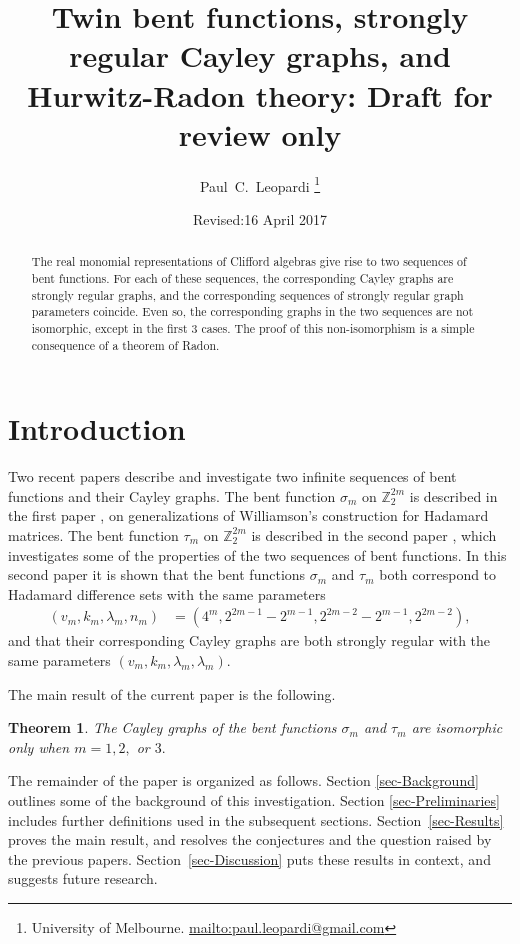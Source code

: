 \documentclass[12pt,a4paper]{article}
\title{Twin bent functions, strongly regular Cayley graphs, and Hurwitz-Radon theory:
Draft for review only}
\author{
Paul~C.~Leopardi
\thanks{University of Melbourne.
\protect\url{mailto:paul.leopardi@gmail.com}}
}
\date{Revised:16 April 2017}
\newcommand{\mb}[1]{\mathbb{#1}}
\newcommand{\Z}{\mb{Z}}
\newtheorem{Theorem}{Theorem}
\begin{document}
\maketitle

\begin{abstract}
%
The real monomial representations of Clifford algebras
give rise to two sequences of bent functions.
For each of these sequences, the corresponding Cayley graphs are
strongly regular graphs, and the corresponding sequences of strongly regular graph parameters coincide.
Even so, the corresponding graphs in the two sequences are not isomorphic, except in the first 3 cases.
The proof of this non-isomorphism is a simple consequence of a theorem of Radon.
%
\end{abstract}

\section{Introduction}
\label{sec-Introduction}
Two recent papers \cite{Leo14Constructions,Leo15Twin} describe and investigate two infinite sequences of bent functions and their Cayley graphs.
The bent function $\sigma_m$ on $\Z_2^{2 m}$ is described in the first paper \cite{Leo14Constructions}, on
generalizations of Williamson's construction for Hada\-mard matrices.
The bent function $\tau_m$ on $\Z_2^{2 m}$ is described in the second paper \cite{Leo15Twin},
which investigates some of the properties of the two sequences of bent functions.
In this second paper it is shown that the bent functions $\sigma_m$ and $\tau_m$ both correspond to Hada\-mard difference sets with the same parameters
\begin{align*}
(v_m,k_m,\lambda_m,n_m) &= (4^m, 2^{2 m - 1} - 2^{m-1}, 2^{2 m - 2} - 2^{m-1}, 2^{2 m - 2}),
\end{align*}
and that their corresponding Cayley graphs are both strongly regular with the same parameters $(v_m,k_m,\lambda_m,\lambda_m)$.

The main result of the current paper is the following.
\begin{Theorem}\label{HR-non-imomorphic-theorem}
The Cayley graphs of the bent functions $\sigma_m$ and $\tau_m$ are isomorphic only when $m=1, 2,$ or $3.$
\end{Theorem}

The remainder of the paper is organized as follows.
Section \ref{sec-Background} outlines some of the background of this investigation.
Section \ref{sec-Preliminaries} includes further definitions used in the subsequent sections.
Section~\ref{sec-Results} proves the main result, and resolves the conjectures and the question raised by the previous papers.
Section~\ref{sec-Discussion} puts these results in context, and suggests future research.
\end{document}
